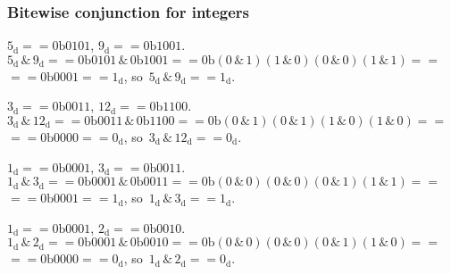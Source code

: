 \documentclass[10pt,t]{beamer}
\begin{document}
\begin{frame}
  \frametitle{Bitewise conjunction for integers}


  $5_{ \text{d} } == 0\text{b}0101$, $9_{ \text{d} } == 0\text{b}1001$. \\
  $5_{ \text{d} } \, \& \, 9_{ \text{d} } == 0\text{b}0101 \, \& \,
  0\text{b}1001 == 0\text{b}( 0 \, \& \, 1 )( 1 \, \& \, 0 )
  ( 0 \, \& \, 0 )( 1 \, \& \, 1 ) ==$ \\
  $== 0\text{b}0001 == 1_{ \text{d} }$,
  so~$5_{ \text{d} } \, \& \, 9_{ \text{d} } == 1_{ \text{d} }$.

  $3_{ \text{d} } == 0\text{b}0011$, $12_{ \text{d} } == 0\text{b}1100$. \\
  $3_{ \text{d} } \, \& \, 12_{ \text{d} } == 0\text{b}0011 \, \& \,
  0\text{b}1100 == 0\text{b}( 0 \, \& \, 1 )( 0 \, \& \, 1 )
  ( 1 \, \& \, 0 )( 1 \, \& \, 0 ) ==$ \\
  $== 0\text{b}0000 == 0_{ \text{d} }$,
  so~$3_{ \text{d} } \, \& \, 12_{ \text{d} } == 0_{ \text{d} }$.

  $1_{ \text{d} } == 0\text{b}0001$, $3_{ \text{d} } == 0\text{b}0011$. \\
  $1_{ \text{d} } \, \& \, 3_{ \text{d} } == 0\text{b}0001 \, \& \,
  0\text{b}0011 == 0\text{b}( 0 \, \& \, 0 )( 0 \, \& \, 0 )
  ( 0 \, \& \, 1 )( 1 \, \& \, 1 ) ==$ \\
  $== 0\text{b}0001 == 1_{ \text{d} }$,
  so~$1_{ \text{d} } \, \& \, 3_{ \text{d} } == 1_{ \text{d} }$.

  $1_{ \text{d} } == 0\text{b}0001$, $2_{ \text{d} } == 0\text{b}0010$. \\
  $1_{ \text{d} } \, \& \, 2_{ \text{d} } == 0\text{b}0001 \, \& \,
  0\text{b}0010 == 0\text{b}( 0 \, \& \, 0 )( 0 \, \& \, 0 )
  ( 0 \, \& \, 1 )( 1 \, \& \, 0 ) ==$ \\
  $== 0\text{b}0000 == 0_{ \text{d} }$,
  so~$1_{ \text{d} } \, \& \, 2_{ \text{d} } == 0_{ \text{d} }$.

\end{frame}
\end{document}
